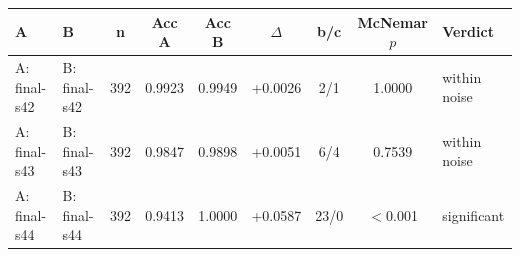 \begin{tabular}{llcccccc l}
\toprule
A & B & n & Acc A & Acc B & $\Delta$ & b/c & McNemar $p$ & Verdict \\
\midrule
A: final-s42 & B: final-s42 & 392 & 0.9923 & 0.9949 & +0.0026 & 2/1 & 1.0000 & within noise\\
A: final-s43 & B: final-s43 & 392 & 0.9847 & 0.9898 & +0.0051 & 6/4 & 0.7539 & within noise\\
A: final-s44 & B: final-s44 & 392 & 0.9413 & 1.0000 & +0.0587 & 23/0 & $<$0.001 & significant \\
\bottomrule
\end{tabular}
